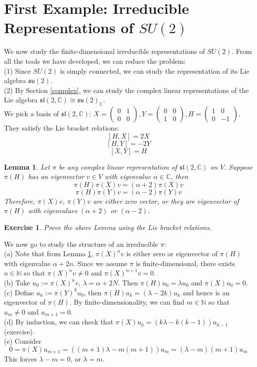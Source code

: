 \documentclass[11pt]{book}
\newtheorem{lemma}[theorem]{Lemma}
\newtheorem{exercise}[theorem]{Exercise}
\newcommand{\bb}[1]{\mathbb{#1}}
\newcommand{\mf}[1]{\mathfrak{#1}}
\begin{document}
\section{First Example: Irreducible Representations of $SU(2)$}
We now study the finite-dimensional irreducible representations of $SU(2)$. From all the tools we have developed, we can reduce the problem:\\
(1) Since $SU(2)$ is simply connected, we can study the representation of its Lie algebra $\mf{su}(2)$.\\
(2) By Section \ref{complex}, we can study the complex linear representations of the Lie algebra $\mf{sl}(2,\bb{C}) \cong \mf{su}(2)_{\bb{C}}$.\\
We pick a basis of $\mf{sl}(2,\bb{C})$: $X = \left( \begin{array}{cc}
0 & 1 \\
0 & 0 \end{array} \right), Y = \left( \begin{array}{cc}
0 & 0 \\
1 & 0 \end{array} \right), H = \left( \begin{array}{cc}
1 & 0 \\
0 & -1 \end{array} \right)$. They satisfy the Lie bracket relations:
$$[H,X] = 2X$$
$$[H,Y] = -2Y$$
$$[X,Y] = H$$
\begin{lemma} \label{sl2triple}
Let $\pi$ be any complex linear representation of $\mf{sl}(2,\bb{C})$ on $V$. Suppose $\pi(H)$ has an eigenvector $v \in V$ with eigenvalue $\alpha \in \bb{C}$, then
$$\pi(H)\pi(X)v = (\alpha+2)\pi(X)v$$
$$\pi(H)\pi(Y)v = (\alpha-2)\pi(Y)v$$
Therefore, $\pi(X)v$, $\pi(Y)v$ are either zero vector, or they are eigenvector of $\pi(H)$ with eigenvalues $(\alpha+2)$ or $(\alpha-2)$.
\end{lemma}
\begin{exercise}
Prove the above Lemma using the Lie bracket relations.
\end{exercise}
We now go to study the structure of an irreducible $\pi$:\\
(a) Note that from Lemma \ref{sl2triple}, $\pi(X)^nv$ is either zero or eigenvector of $\pi(H)$ with eigenvalue $\alpha + 2n$. Since we assume $\pi$ is finite-dimensional, there exists $n \in \bb{N}$ so that $\pi(X)^nv \neq 0$ and $\pi(X)^{n+1}v = 0$.\\
(b) Take $u_0 := \pi(X)^nv$, $\lambda = \alpha + 2N$. Then $\pi(H)u_0 = \lambda u_0$ and $\pi(X)u_0 = 0$.\\
(c) Define $u_k := \pi(Y)^ku_0$, then $\pi(H)u_k = (\lambda - 2k)u_k$ and hence is an eigenvector of $\pi(H)$. By finite-dimensionality, we can find $m \in \bb{N}$ so that $u_m \neq 0$ and $u_{m+1} = 0$.\\
(d) By induction, we can check that $\pi(X)u_k = (k\lambda - k(k-1))u_{k-1}$ (exercise).\\
(e) Consider
$$0 = \pi(X)u_{m+1} = ((m+1)\lambda - m(m+1))u_m  = (\lambda - m)(m+1) u_m$$
This forces $\lambda - m = 0$, or $\lambda = m$.\\
\end{document}
